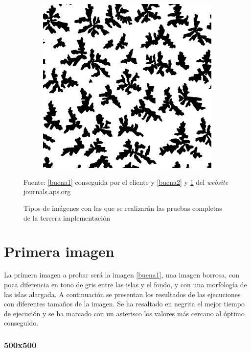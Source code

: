 \begin{figure}[H]
\begin{center}
\begin{subfigure}[t]{2.5in}
			\includegraphics[width=.8\textwidth]{./imagenes/buena3}	
			\subcaption{}\label{buena3}
		\end{subfigure}
	\end{center}
	\caption{Tipos de im\'{a}genes con las que se realizar\'{a}n las pruebas completas de la tercera implementaci\'{o}n}
	Fuente: \ref{buena1} conseguida por el cliente y \ref{buena2} y \ref{buena3} del \textit{website} journals.aps.org \cite{jour}
	\label{tiposImagenes}
	
\end{figure} 


\section{Primera imagen}

La primera imagen a probar ser\'{a} la imagen \ref{buena1}, una imagen borrosa, con poca diferencia en tono de gris entre las islas y el fondo, y con una morfolog\'{i}a de las islas alargada. A continuaci\'{o}n se presentan los resultados de las ejecuciones con diferentes tama\~{n}os de la imagen. Se ha resaltado en negrita el mejor tiempo de ejecuci\'{o}n y se ha marcado con un asterisco los valores m\'{a}s cercano al \'{o}ptimo conseguido.

\subsubsection{500x500}


